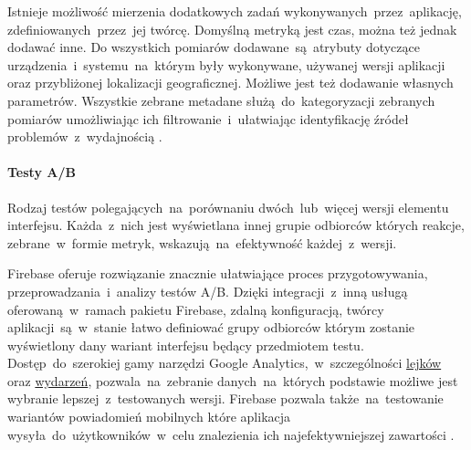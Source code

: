 Istnieje możliwość mierzenia dodatkowych zadań wykonywanych~przez~aplikację, zdefiniowanych~przez~jej twórcę. Domyślną metryką jest czas, można też jednak dodawać inne. Do wszystkich pomiarów dodawane~są~atrybuty dotyczące urządzenia~i~systemu~na~którym były wykonywane, używanej wersji aplikacji oraz przybliżonej lokalizacji geograficznej. Możliwe jest też dodawanie własnych parametrów. Wszystkie zebrane metadane służą~do~kategoryzacji zebranych pomiarów umożliwiając ich  filtrowanie~i~ułatwiając identyfikację źródeł problemów~z~wydajnością \cite{Fb_Pref_Monitor}.

\paragraph{Testy A/B}
Rodzaj testów polegających~na~porównaniu dwóch~lub~więcej wersji elementu interfejsu. Każda~z~nich jest wyświetlana innej grupie odbiorców których reakcje, zebrane~w~formie metryk, wskazują~na~efektywność każdej~z~wersji. 

Firebase oferuje rozwiązanie znacznie ułatwiające proces przygotowywania, przeprowadzania~i~analizy testów A/B. Dzięki integracji~z~inną usługą oferowaną~w~ramach pakietu Firebase, zdalną konfiguracją, twórcy aplikacji~są~w~stanie łatwo definiować grupy odbiorców którym zostanie wyświetlony dany wariant interfejsu będący przedmiotem testu. Dostęp~do~szerokiej gamy narzędzi Google Analytics,~w~szczególności \hyperref[par:ga-funnels]{lejków} oraz  \hyperref[par:ga-events]{wydarzeń}, pozwala~na~zebranie danych~na~których podstawie możliwe jest wybranie lepszej~z~testowanych wersji. Firebase pozwala także~na~testowanie wariantów powiadomień mobilnych które aplikacja wysyła~do~użytkowników~w~celu znalezienia ich najefektywniejszej zawartości \cite{Fb_AB_Testing}.

